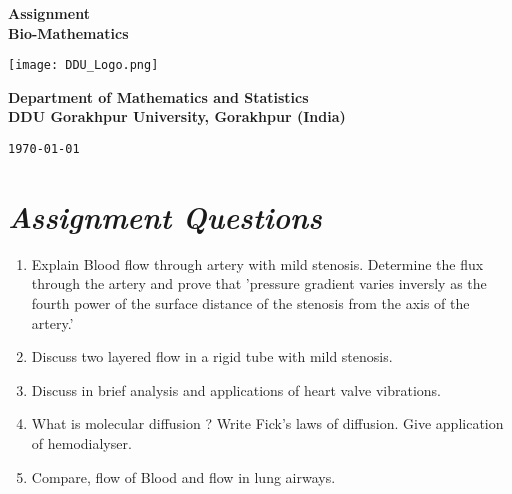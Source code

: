 \documentclass[12pt, a4paper]{article} %
\begin{document}
\begin{titlepage}
    \begin{center}
        \vspace*{1cm}

        \Large{\bf Assignment}\\ 
        \Large{\textbf{Bio-Mathematics}}
        

        \vspace*{1cm}

        \texttt{[image: DDU\_Logo.png]}
        \vspace*{1cm}

        \begin{center}
            {\bf Department of Mathematics and Statistics\\
        DDU Gorakhpur University, Gorakhpur (India)}
        \end{center}
        
        \vfill %

        {\tt \today}\\
    \end{center}
\end{titlepage}

\BgThispage
\tableofcontents
\thispagestyle{empty}
\clearpage

\setcounter{page}{1}


\BgThispage
\section{\slshape Assignment Questions}

\begin{enumerate}
    \item Explain Blood flow through artery with mild stenosis. Determine the flux through the artery and prove that 'pressure gradient varies inversly as the fourth power of the surface distance of the stenosis from the axis of the artery.'
    \item Discuss two layered flow in a rigid tube with mild stenosis.
    \item Discuss in brief analysis and applications of heart valve vibrations.
    \item What is molecular diffusion ? Write Fick's laws of diffusion. Give application of hemodialyser.
    \item Compare, flow of Blood and flow in lung airways.  
\end{enumerate}
\end{document}
